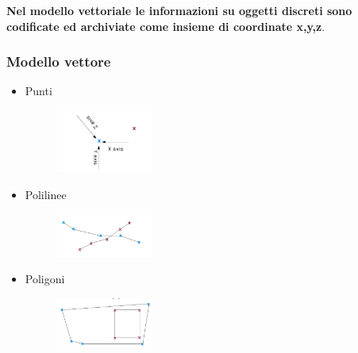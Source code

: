 \documentclass{beamer}
\begin{document}
{\begin{frame}
  \begin{center}
  		\textbf{Nel modello vettoriale le informazioni su oggetti discreti sono codificate ed archiviate come insieme di coordinate x,y,z}.
  \end{center}    
\end{frame} 

\begin{frame}
  \frametitle{Modello vettore}
 \begin{itemize}
    \item Punti
    \begin{figure}[h]
        \centering
        \includegraphics[width=0.3\textwidth]{corso2023/punto.png} %
    \end{figure}

    \item Polilinee
    \begin{figure}[h]
        \centering
        \includegraphics[width=0.3\textwidth]{corso2023/polilinea.png} %
    \end{figure}

    \item Poligoni
    \begin{figure}[h]
        \centering
        \includegraphics[width=0.3\textwidth]{corso2023/poligono.png} %
    \end{figure}
\end{itemize}

\end{frame} 

}
\end{document}
